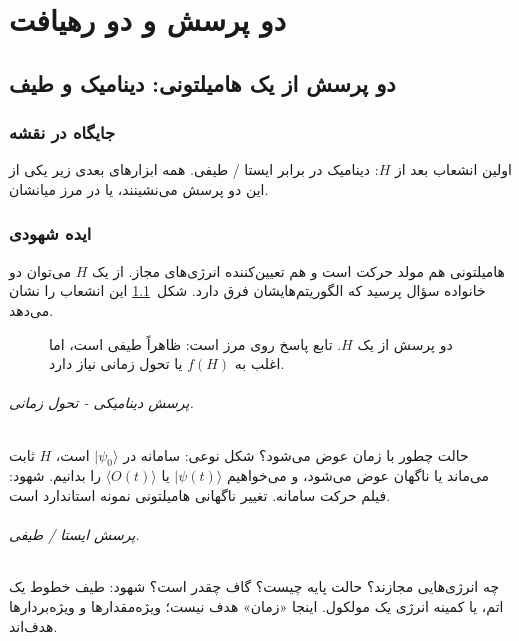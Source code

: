 \part{دو پرسش و دو رهیافت}

\chapter{دو پرسش از یک هامیلتونی: دینامیک و طیف}
\label{chap:dyn-spec}

\section{جایگاه در نقشه}

اولین انشعاب بعد از $H$: دینامیک در برابر ایستا / طیفی. همه ابزارهای بعدی زیر یکی از این دو پرسش می‌نشینند، یا در مرز میانشان.

\section{ایده شهودی}

هامیلتونی هم مولد حرکت است و هم تعیین‌کننده انرژی‌های مجاز. از یک $H$ می‌توان دو خانواده سؤال پرسید که الگوریتم‌هایشان فرق دارد. شکل~\ref{fig:two-questions} این انشعاب را نشان می‌دهد.

\begin{figure}[htbp]
	\centering
	\begin{latin}
		
	\end{latin}
	\caption{دو پرسش از یک $H$. تابع پاسخ روی مرز است: ظاهراً طیفی است، اما اغلب به $f(H)$ یا تحول زمانی نیاز دارد.}
	\label{fig:two-questions}
\end{figure}

\paragraph{پرسش دینامیکی - تحول زمانی.}
حالت چطور با زمان عوض می‌شود؟ شکل نوعی: سامانه در $\lvert\psi_0\rangle$ است، $H$ ثابت می‌ماند یا ناگهان عوض می‌شود، و می‌خواهیم $\lvert\psi(t)\rangle$ یا $\langle O(t)\rangle$ را بدانیم. شهود: فیلم حرکت سامانه. تغییر ناگهانی هامیلتونی نمونه استاندارد است.

\paragraph{پرسش ایستا / طیفی.}
چه انرژی‌هایی مجازند؟ حالت پایه چیست؟ گاف چقدر است؟ شهود: طیف خطوط یک اتم، یا کمینه انرژی یک مولکول. اینجا «زمان» هدف نیست؛ ویژه‌مقدارها و ویژه‌بردارها هدف‌اند.

